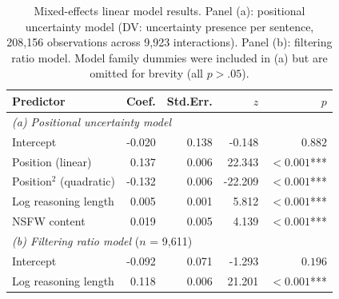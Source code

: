 \begin{table}[t]
\centering
\caption{Mixed-effects linear model results. Panel (a): positional uncertainty model (DV: uncertainty presence per sentence, 208{,}156 observations across 9{,}923 interactions). Panel (b): filtering ratio model. Model family dummies were included in (a) but are omitted for brevity (all $p > .05$).}
\label{tab:regression}
\small
\begin{tabular}{lrrrr}
\toprule
Predictor & Coef. & Std.Err. & $z$ & $p$ \\
\midrule
\multicolumn{5}{l}{\textit{(a) Positional uncertainty model}} \\
\midrule
Intercept & -0.020 & 0.138 & -0.148 & $0.882$ \\
Position (linear) & 0.137 & 0.006 & 22.343 & $< 0.001$*** \\
Position$^2$ (quadratic) & -0.132 & 0.006 & -22.209 & $< 0.001$*** \\
Log reasoning length & 0.005 & 0.001 & 5.812 & $< 0.001$*** \\
NSFW content & 0.019 & 0.005 & 4.139 & $< 0.001$*** \\
\midrule
\multicolumn{5}{l}{\textit{(b) Filtering ratio model} ($n$ = 9{,}611)} \\
\midrule
Intercept & -0.092 & 0.071 & -1.293 & $0.196$ \\
Log reasoning length & 0.118 & 0.006 & 21.201 & $< 0.001$*** \\
\bottomrule
\end{tabular}
\end{table}